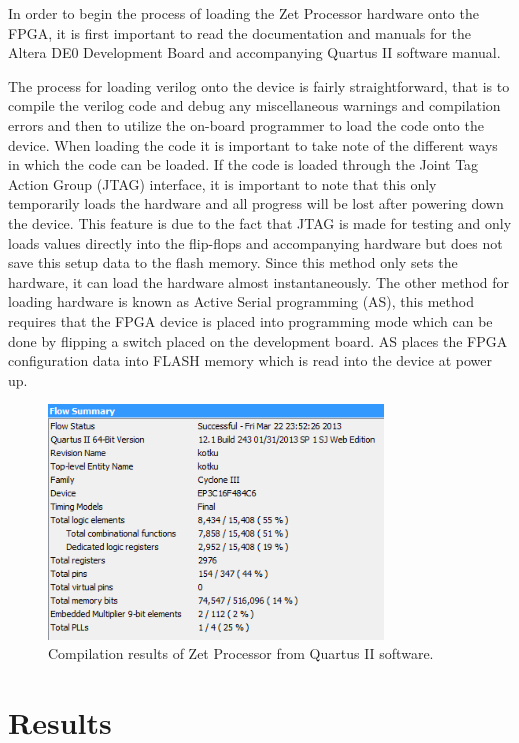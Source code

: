 \documentclass[conference]{IEEEtran}
\begin{document}
In order to begin the process of loading the Zet Processor hardware onto the FPGA, it is first important to read the documentation and manuals for the Altera DE0 Development Board and accompanying Quartus II software manual. 

The process for loading verilog onto the device is fairly straightforward, that is to compile the verilog code and debug any miscellaneous warnings and compilation errors and then to utilize the on-board programmer to load the code onto the device. When loading the code it is important to take note of the different ways in which the code can be loaded. If the code is loaded through the Joint Tag Action Group (JTAG) interface, it is important to note that this only temporarily loads the hardware and all progress will be lost after powering down the device. This feature is due to the fact that JTAG is made for testing and only loads values directly into the flip-flops and accompanying hardware but does not save this setup data to the flash memory. Since this method only sets the hardware, it can load the hardware almost instantaneously. The other method for loading hardware is known as Active Serial programming (AS), this method requires that the FPGA device is placed into programming mode which can be done by flipping a switch placed on the development board. AS places the FPGA configuration data into FLASH memory which is read into the device at power up. 

\begin{figure}[!h]
\centering
\includegraphics[width=3.5in]{CompileResults}
\caption{Compilation results of Zet Processor from Quartus II software.}
\label{fig:CompileResults}
\end{figure}

\section{Results}
\end{document}
